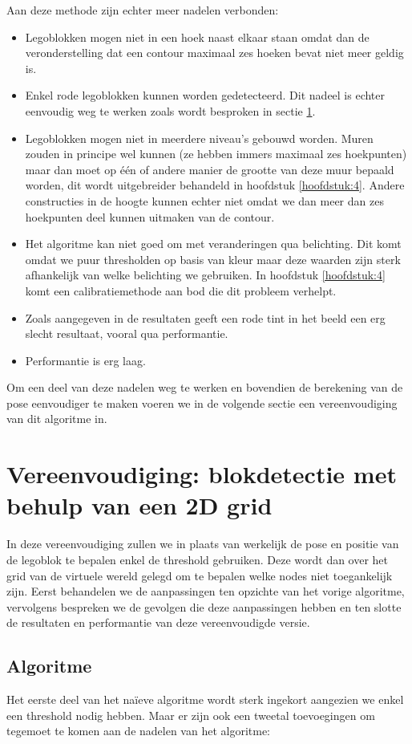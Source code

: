 Aan deze methode zijn echter meer nadelen verbonden:
\begin{itemize}
\item Legoblokken mogen niet in een hoek naast elkaar staan omdat dan de veronderstelling dat een contour maximaal zes hoeken bevat niet meer geldig is.
\item Enkel rode legoblokken kunnen worden gedetecteerd. Dit nadeel is echter eenvoudig weg te werken zoals wordt besproken in sectie \ref{sec:naive_vereenv}.
\item Legoblokken mogen niet in meerdere niveau's gebouwd worden. Muren zouden in principe wel kunnen (ze hebben immers maximaal zes hoekpunten) maar dan moet op \'e\'en of andere manier de grootte van deze muur bepaald worden, dit wordt uitgebreider behandeld in hoofdstuk \ref{hoofdstuk:4}. Andere constructies in de hoogte kunnen echter niet omdat we dan meer dan zes hoekpunten deel kunnen uitmaken van de contour.
\item Het algoritme kan niet goed om met veranderingen qua belichting. Dit komt omdat we puur thresholden op basis van kleur maar deze waarden zijn sterk afhankelijk van welke belichting we gebruiken. In hoofdstuk \ref{hoofdstuk:4} komt een calibratiemethode aan bod die dit probleem verhelpt.
\item Zoals aangegeven in de resultaten geeft een rode tint in het beeld een erg slecht resultaat, vooral qua performantie.
\item Performantie is erg laag.
\end{itemize}

Om een deel van deze nadelen weg te werken en bovendien de berekening van de pose eenvoudiger te maken voeren we in de volgende sectie een vereenvoudiging van dit algoritme in.
 
\section{Vereenvoudiging: blokdetectie met behulp van een 2D grid} \label{sec:naive_vereenv}
In deze vereenvoudiging zullen we in plaats van werkelijk de pose en positie van de legoblok te bepalen enkel de threshold gebruiken. Deze wordt dan over het grid van de virtuele wereld gelegd om te bepalen welke nodes niet toegankelijk zijn. Eerst behandelen we de aanpassingen ten opzichte van het vorige algoritme, vervolgens bespreken we de gevolgen die deze aanpassingen hebben en ten slotte de resultaten en performantie van deze vereenvoudigde versie.

\subsection{Algoritme}
Het eerste deel van het na\"ieve algoritme wordt sterk ingekort aangezien we enkel een threshold nodig hebben. Maar er zijn ook een tweetal toevoegingen om tegemoet te komen aan de nadelen van het algoritme:

